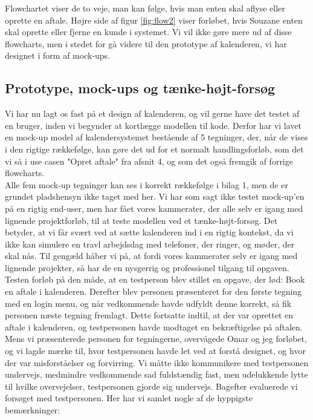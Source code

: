 \documentclass[12pt]{article}   %
\begin{document}
\vspace{0.5cm}

Flowchartet viser de to veje, man kan følge, hvis man enten skal aflyse eller oprette en aftale. Højre side af figur \ref{fig:flow2} viser forløbet, hvis Souzane enten skal oprette eller fjerne en kunde i systemet. Vi vil ikke gøre mere ud af disse flowcharts, men i stedet for gå videre til den prototype af kalenderen, vi har designet i form af mock-ups. \\

\subsection{Prototype, mock-ups og tænke-højt-forsøg}
Vi har nu lagt os fast på et design af kalenderen, og vil gerne have det testet af en bruger, inden vi begynder at kortlægge modellen til kode. Derfor har vi lavet en mock-up model af kalendersystemet bestående af 5 tegninger, der, når de vises i den rigtige rækkefølge, kan gøre det ud for et normalt handlingsforløb, som det vi så i use casen "Opret aftale" fra afsnit 4, og som det også fremgik af forrige flowcharts. \\
Alle fem mock-up tegninger kan ses i korrekt rækkefølge i bilag 1, men de er grundet pladshensyn ikke taget med her. Vi har som sagt ikke testet mock-up'en på en rigtig end-user, men har fået vores kammerater, der alle selv er igang med lignende projektforløb, til at teste modellen ved et tænke-højt-forsøg. Det betyder, at vi får svært ved at sætte kalenderen ind i en rigtig kontekst, da vi ikke kan simulere en travl arbejdsdag med telefoner, der ringer, og møder, der skal nås. Til gengæld håber vi på, at fordi vores kammerater selv er igang med lignende projekter, så har de en nysgerrig og professionel tilgang til opgaven. \\
Testen forløb på den måde, at en testperson blev stillet en opgave, der lød: Book en aftale i kalenderen. Derefter blev personen præsenteret for den første tegning med en login menu, og når vedkommende havde udfyldt denne korrekt, så fik personen næste tegning fremlagt. Dette fortsatte indtil, at der var oprettet en aftale i kalenderen, og testpersonen havde modtaget en bekræftigelse på aftalen. Mens vi præsenterede personen for tegningerne, overvågede Omar og jeg forløbet, og vi lagde mærke til, hvor testpersonen havde let ved at forstå designet, og hvor der var misforståelser og forvirring. Vi måtte ikke kommunikere med testpersonen undervejs, medmindre vedkommende sad fuldstændig fast, men udelukkende lytte til hvilke overvejelser, testpersonen gjorde sig undervejs. Bagefter evaluerede vi forsøget med testpersonen. Her har vi samlet nogle af de hyppigste bemærkninger:
\end{document}
